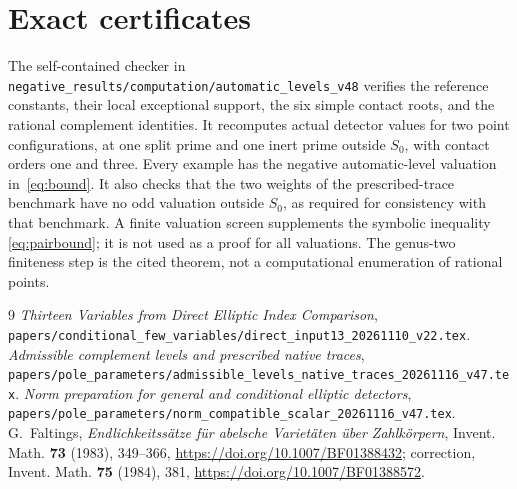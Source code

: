 \documentclass[11pt,a4paper]{article}
\begin{document}
\section{Exact certificates}

The self-contained checker in
\nolinkurl{negative_results/computation/automatic_levels_v48}
verifies the reference constants, their local exceptional support, the
six simple contact roots, and the rational complement identities.
It recomputes actual detector values for two point configurations, at
one split prime and one inert prime outside $S_0$, with contact orders
one and three. Every example has the negative automatic-level
valuation in~\eqref{eq:bound}. It also checks that the two weights of
the prescribed-trace benchmark have no odd valuation outside $S_0$,
as required for consistency with that benchmark.
A finite valuation screen supplements the symbolic inequality
\eqref{eq:pairbound}; it is not used as a proof for all valuations.
The genus-two finiteness step is the cited theorem, not a computational
enumeration of rational points.

\begin{thebibliography}{9}
\emph{Thirteen Variables from Direct Elliptic Index Comparison},
\nolinkurl{papers/conditional_few_variables/direct_input13_20261110_v22.tex}.
\emph{Admissible complement levels and prescribed native traces},
\nolinkurl{papers/pole_parameters/admissible_levels_native_traces_20261116_v47.tex}.
\emph{Norm preparation for general and conditional elliptic detectors},
\nolinkurl{papers/pole_parameters/norm_compatible_scalar_20261116_v47.tex}.
 G.~Faltings,
\emph{Endlichkeitss\"atze f\"ur abelsche Variet\"aten \"uber Zahlk\"orpern},
Invent. Math. \textbf{73} (1983), 349--366,
\url{https://doi.org/10.1007/BF01388432}; correction,
Invent. Math. \textbf{75} (1984), 381,
\url{https://doi.org/10.1007/BF01388572}.
\end{thebibliography}
\end{document}
